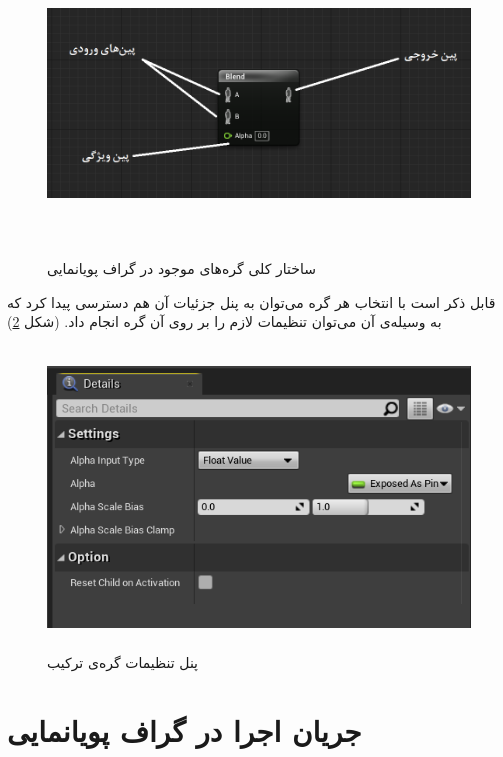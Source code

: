 \begin{figure}[ht]
	\centerline{\includegraphics[width=\textwidth,height=8cm,keepaspectratio]{Figures/Ch3/AnimNodeStructure.png}}

	\caption{ساختار کلی گره‌های موجود در گراف پویانمایی}
	\label{fig:AnimNodeStructure}
\end{figure}

قابل ذکر است با انتخاب هر گره می‌توان به پنل جزئیات آن هم دسترسی پیدا کرد 
که به وسیله‌ی‌ آن می‌توان تنظیمات لازم را بر روی آن گره انجام داد.
(شکل \ref{fig:AnimNodeDetailPanel})

\begin{figure}[ht]
	\centerline{\includegraphics[width=\textwidth,height=8cm,keepaspectratio]{Figures/Ch3/DetailsPanel.png}}

	\caption{پنل تنظیمات گره‌ی ترکیب}
	\label{fig:AnimNodeDetailPanel}
\end{figure}

\section{جریان اجرا در گراف پویانمایی}


